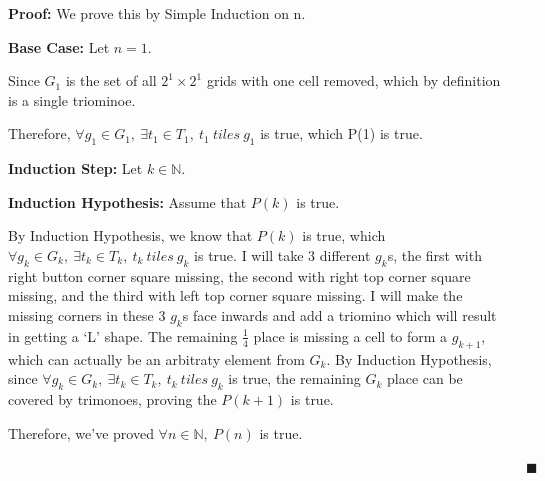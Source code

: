 \documentclass[12pt]{article}
\begin{document}
\begin{enumerate}[label=(\alph*)]
    \textbf{Proof:} We prove this by Simple Induction on n.


    \textbf{Base Case:} Let $n = 1$.

    Since $G_1$ is the set of all $2^1 \times 2^1$ grids with one cell removed, which by definition is a single triominoe.
    
    Therefore, $\forall g_1 \in G_1,\ \exists t_1 \in T_1,\ t_1\ tiles\ g_1$ is true, which P(1) is true.

    \textbf{Induction Step:} Let $k \in \mathbb{N}$.
    
    \textbf{Induction Hypothesis:} Assume that $P(k)$ is true.

    By Induction Hypothesis, we know that $P(k)$ is true, which $\forall g_k \in G_k,\ \exists t_k \in T_k,\ t_k\ tiles\ g_k $ is true.
    I will take 3 different $g_k$s, the first with right button corner square missing, the second with right top corner square missing, and the third with left top corner square missing.
    I will make the missing corners in these 3 $g_k$s face inwards and add a triomino which will result in getting a `L' shape.
    The remaining $\frac{1}{4}$ place is missing a cell to form a $g_{k+1}$, which can actually be an arbitraty element from $G_k$.
    By Induction Hypothesis, since $\forall g_k \in G_k,\ \exists t_k \in T_k,\ t_k\ tiles\ g_k $ is true, the remaining $G_k$ place can be covered by trimonoes, proving the $P(k+1)$ is true.

    Therefore, we've proved $\forall n \in \mathbb{N},\ P(n)$ is true. 

    $\quad \quad \quad \quad \quad \quad \quad \quad \quad \quad \quad \quad \quad \quad \quad \quad \quad \quad \quad \quad \quad \quad \quad \quad \quad \quad \quad \quad \quad \quad \quad \quad \quad \quad \quad \quad \quad \blacksquare $
\end{enumerate}

\newpage
\end{document}
